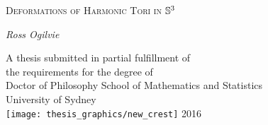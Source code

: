 
\cleardoublepage\thispagestyle{empty}
\begin{center}
{\huge{\scshape Deformations of Harmonic Tori in} $\S^3$\par}
\vspace{2cm}
{\Large\itshape Ross Ogilvie \par}
\vfil\vfil\vfil
    A thesis submitted in partial fulfillment of\\
    the requirements for the degree of\\
    Doctor of Philosophy
\vfil\vfil
  {\large{School of Mathematics and Statistics}\\[5pt]
  University of Sydney}\\
  \vskip6mm
  \texttt{[image: thesis\_graphics/new\_crest]}
\vfil
  \normalsize 2016
\vfil
\end{center}
\cleardoublepage
